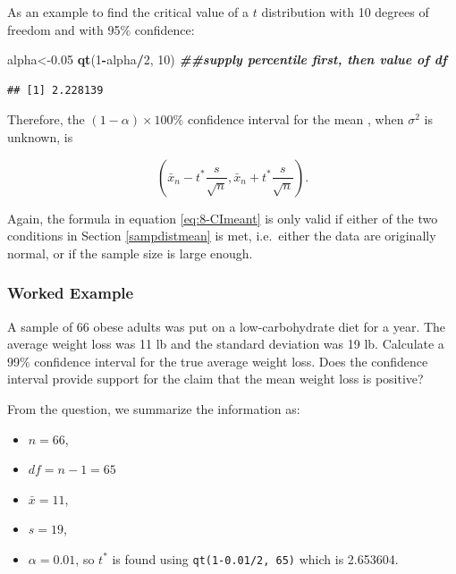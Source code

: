\documentclass[
]{book}
\newenvironment{Shaded}{\begin{snugshade}}{\end{snugshade}}
\newcommand{\DecValTok}[1]{\textcolor[rgb]{0.00,0.00,0.81}{#1}}
\newcommand{\DocumentationTok}[1]{\textcolor[rgb]{0.56,0.35,0.01}{\textbf{\textit{#1}}}}
\newcommand{\FloatTok}[1]{\textcolor[rgb]{0.00,0.00,0.81}{#1}}
\newcommand{\FunctionTok}[1]{\textcolor[rgb]{0.13,0.29,0.53}{\textbf{#1}}}
\newcommand{\NormalTok}[1]{#1}
\newcommand{\OtherTok}[1]{\textcolor[rgb]{0.56,0.35,0.01}{#1}}
\newcommand{\SpecialCharTok}[1]{\textcolor[rgb]{0.81,0.36,0.00}{\textbf{#1}}}
\providecommand{\tightlist}{%
  \setlength{\itemsep}{0pt}\setlength{\parskip}{0pt}}
\begin{document}
As an example to find the critical value of a \(t\) distribution with 10 degrees of freedom and with 95\% confidence:

\begin{Shaded}
\begin{Highlighting}[]
\NormalTok{alpha}\OtherTok{\textless{}{-}}\FloatTok{0.05}
\FunctionTok{qt}\NormalTok{(}\DecValTok{1}\SpecialCharTok{{-}}\NormalTok{alpha}\SpecialCharTok{/}\DecValTok{2}\NormalTok{, }\DecValTok{10}\NormalTok{) }\DocumentationTok{\#\#supply percentile first, then value of df}
\end{Highlighting}
\end{Shaded}

\begin{verbatim}
## [1] 2.228139
\end{verbatim}

Therefore, the \((1-\alpha) \times 100\%\) confidence interval for the mean , when \(\sigma^2\) is unknown, is

\begin{equation} 
\left( \bar{x}_n - t^{*} \frac{s}{\sqrt{n}}, \bar{x}_n + t^{*} \frac{s}{\sqrt{n}} \right).
\label{eq:8-CImeant}
\end{equation}

Again, the formula in equation \eqref{eq:8-CImeant} is only valid if either of the two conditions in Section \ref{sampdistmean} is met, i.e.~either the data are originally normal, or if the sample size is large enough.

\subsubsection{Worked Example}\label{worked-example-2}

A sample of 66 obese adults was put on a low-carbohydrate diet for a year. The average weight loss was 11 lb and the
standard deviation was 19 lb. Calculate a 99\% confidence interval for the true average weight loss. Does the confidence interval provide support for the claim that the mean weight loss is positive?

From the question, we summarize the information as:

\begin{itemize}
\tightlist
\item
  \(n = 66\),
\item
  \(df = n-1 = 65\)
\item
  \(\bar{x} = 11\),
\item
  \(s = 19\),
\item
  \(\alpha = 0.01\), so \(t^*\) is found using \texttt{qt(1-0.01/2,\ 65)} which is 2.653604.
\end{itemize}
\end{document}
